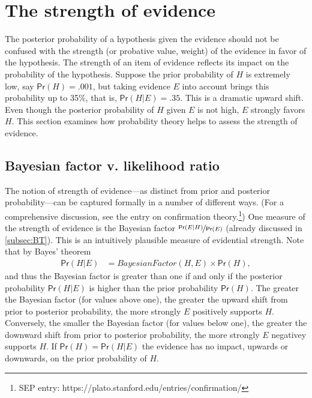 \documentclass{article}
\newcommand{\pr}{\mathsf{Pr}}
\begin{document}
\section{The strength of evidence}
\label{sec:LR}


The posterior probability of a hypothesis given the  evidence %
should not be confused with the strength  (or probative value, weight) of the evidence in favor of the hypothesis. 
The strength of an item of evidence reflects its impact on the probability of the hypothesis.
Suppose the prior probability of $H$ is extremely low, say $\pr(H)=.001$, but taking evidence $E$ into account brings this probability up to 35\%, that is, $\pr(H \vert E)=.35$. This is a dramatic upward shift. Even though the posterior probability of $H$ given $E$ is not high, $E$ strongly favors $H$.  %
This section examines how %
probability theory helps 
to assess the strength of evidence. 
 






\subsection{Bayesian factor v. likelihood ratio}
\label{subse:LRlogical}

The notion of  strength of evidence---as distinct from prior and posterior probability---can be captured formally  in a number of different ways.
(For a comprehensive discussion, see the entry on confirmation theory.\footnote{SEP entry: https://plato.stanford.edu/entries/confirmation/})
One measure of the strength of evidence is the Bayesian factor $\nicefrac{\pr(E \vert H)}{\pr(E)}$ (already discussed in \ref{subsec:BT}). %
This is an intuitively plausible measure of evidential strength. Note that by Bayes' theorem
\begin{align*}\pr(H \vert E) & = \textit{BayesianFactor}(H, E) \times \pr(H),\end{align*}
and thus the Bayesian factor is greater than one if and only if
the posterior probability $\pr(H \vert E)$ is higher than the prior probability $\pr(H)$. %
The greater the Bayesian factor (for values above one), the greater the upward shift from prior to posterior probability, the more strongly $E$ positively supports $H$.
Conversely, the smaller the Bayesian factor (for values below one), the greater the downward shift from prior to posterior probability, the more strongly $E$ negativey supports $H$. If $\pr(H)=\pr(H\vert E)$ the evidence  has no impact, upwards or downwards, on the prior probability of $H$. %
\end{document}
